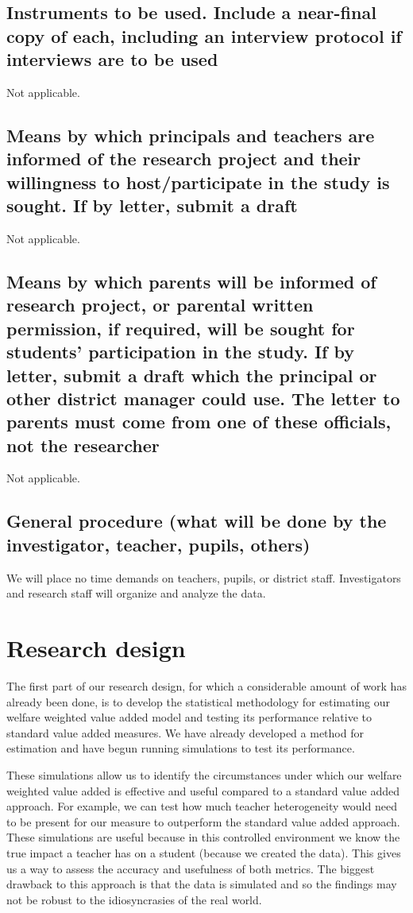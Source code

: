 \documentclass[letterpaper,12pt]{article}
\begin{document}
\subsection{Instruments to be used. Include a near-final copy of each, including an interview protocol if interviews are to be used}
Not applicable.



\subsection{Means by which principals and teachers are informed of the research project and their willingness to host/participate in the study is sought. If by letter, submit a draft}
Not applicable.



\subsection{Means by which parents will be informed of research project, or parental written permission, if required, will
be sought for students’ participation in the study. If by letter, submit a draft which the principal or other district
manager could use. The letter to parents must come from one of these officials, not the researcher}
Not applicable.



\subsection{General procedure (what will be done by the investigator, teacher, pupils, others)}
We will place no time demands on teachers, pupils, or district staff. Investigators and research staff will organize and analyze the data.



\section{Research design}
The first part of our research design, for which a considerable amount of work has already been done, is to develop the statistical methodology for estimating our welfare weighted value added model and testing its performance relative to standard value added measures. We have already developed a method for estimation and have begun running simulations to test its performance. 

These simulations allow us to identify the circumstances under which our welfare weighted value added is effective and useful compared to a standard value added approach. For example, we can test how much teacher heterogeneity would need to be present for our measure to outperform the standard value added approach. These simulations are useful because in this controlled environment we know the true impact a teacher has on a student (because we created the data). This gives us a way to assess the accuracy and usefulness of both metrics. The biggest drawback to this approach is that the data is simulated and so the findings may not be robust to the idiosyncrasies of the real world. 
\end{document}
